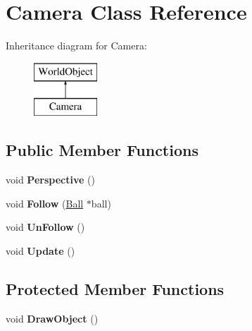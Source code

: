 \hypertarget{class_camera}{\section{Camera Class Reference}
\label{class_camera}
}
Inheritance diagram for Camera\+:\begin{figure}[H]
\begin{center}
\leavevmode
\includegraphics[height=2.000000cm]{class_camera}
\end{center}
\end{figure}
\subsection*{Public Member Functions}
\begin{DoxyCompactItemize}
\item 
\hypertarget{class_camera_aa2f1b00493b49201482e3836d8969d08}{void {\bfseries Perspective} ()}\label{class_camera_aa2f1b00493b49201482e3836d8969d08}

\item 
\hypertarget{class_camera_a8a49e140cb548b3fc11c61c8f48214c4}{void {\bfseries Follow} (\hyperlink{class_ball}{Ball} $\ast$ball)}\label{class_camera_a8a49e140cb548b3fc11c61c8f48214c4}

\item 
\hypertarget{class_camera_a8161f7e096c69039c67d55661abb85f6}{void {\bfseries Un\+Follow} ()}\label{class_camera_a8161f7e096c69039c67d55661abb85f6}

\item 
\hypertarget{class_camera_a4a596a3ea1fdc7d244ba4268031a360b}{void {\bfseries Update} ()}\label{class_camera_a4a596a3ea1fdc7d244ba4268031a360b}

\end{DoxyCompactItemize}
\subsection*{Protected Member Functions}
\begin{DoxyCompactItemize}
\item 
\hypertarget{class_camera_ac8552e15d6c3eabd50ddf300520ca8a1}{void {\bfseries Draw\+Object} ()}\label{class_camera_ac8552e15d6c3eabd50ddf300520ca8a1}

\end{DoxyCompactItemize}
